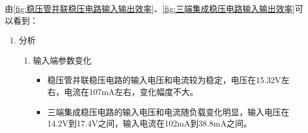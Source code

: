 \documentclass[dvipsnames, svgnames,a4paper,11pt]{article}
\begin{document}
\begin{enumerate}
					
			
				由\cref{fig:稳压管并联稳压电路输入输出效率}、\cref{fig:三端集成稳压电路输入输出效率}可以看到：

				\begin{enumerate}
				
				
					\item 分析
						\begin{enumerate}
							\item 输入端参数变化
								\begin{itemize}
									\item 稳压管并联稳压电路的输入电压和电流较为稳定，电压在15.32V左右，电流在107mA左右，变化幅度不大。
									\item 三端集成稳压电路的输入电压和电流随负载变化明显，输入电压在14.2V到17.4V之间，输入电流在102mA到38.8mA之间。
								\end{itemize}
							

\end{enumerate}
\end{enumerate}
\end{enumerate}
\end{document}
